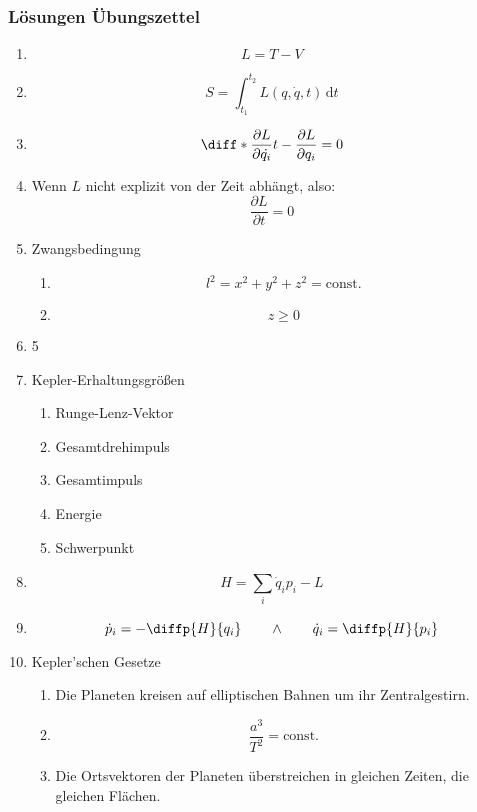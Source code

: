 \documentclass[a4paper,12pt]{article}
\newcommand{\td}{\,\text{d}}
\numberwithin{equation}{section}
\begin{document}
\newpage
\subsubsection{Lösungen Übungszettel}
\begin{enumerate}[label=\arabic*.]
        \item $$L=T-V$$
        \item $$S=\int_{t_1}^{t_2}L\left(q, \dot{q}, t\right)\td t$$
        \item $$\diff*{\frac{\partial L}{\partial \dot{q_i} }}{t}-\frac{\partial L}{\partial {q_i}}=0 $$
        \item Wenn $L$ nicht explizit von der Zeit abhängt, also: $$\frac{\partial L}{\partial t} = 0$$
        \item Zwangsbedingung
        \begin{enumerate}[label=\alph*)]
                \item $$l^2 = x^2+y^2+z^2=\text{const.}$$
                \item $$ z \geq 0$$
        \end{enumerate}
        \item 5
        \item Kepler-Erhaltungsgrößen
        \begin{enumerate}[label=\alph*)]
                \item Runge-Lenz-Vektor
                \item Gesamtdrehimpuls
                \item Gesamtimpuls
                \item Energie
                \item Schwerpunkt
        \end{enumerate}
        \item $$H=\sum_{i}^{}\dot{q}_i p_i - L$$
        \item $$\dot{p}_i = - \diffp{H}{q_i} \qquad \land \qquad \dot{q}_i = \diffp{H}{{p}_i}  $$
        \item Kepler'schen Gesetze
        \begin{enumerate}[label=\alph*)]
                \item Die Planeten kreisen auf elliptischen Bahnen um ihr Zentralgestirn.
                \item $$\frac{a^3}{T^2} = \text{const.}$$
                \item Die Ortsvektoren der Planeten überstreichen in gleichen Zeiten, die gleichen Flächen.
        \end{enumerate}

\end{enumerate}
\end{document}
